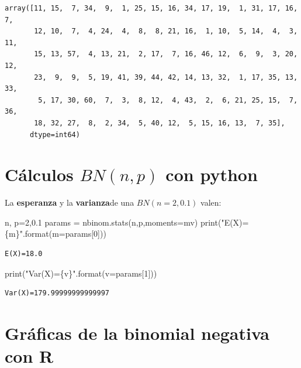 \documentclass[
  letterpaper,
  DIV=11,
  numbers=noendperiod]{scrreprt}
\newenvironment{Shaded}{\begin{snugshade}}{\end{snugshade}}
\newcommand{\BuiltInTok}[1]{\textcolor[rgb]{0.00,0.23,0.31}{#1}}
\newcommand{\DecValTok}[1]{\textcolor[rgb]{0.68,0.00,0.00}{#1}}
\newcommand{\FloatTok}[1]{\textcolor[rgb]{0.68,0.00,0.00}{#1}}
\newcommand{\NormalTok}[1]{\textcolor[rgb]{0.00,0.23,0.31}{#1}}
\newcommand{\OperatorTok}[1]{\textcolor[rgb]{0.37,0.37,0.37}{#1}}
\newcommand{\SpecialCharTok}[1]{\textcolor[rgb]{0.37,0.37,0.37}{#1}}
\newcommand{\StringTok}[1]{\textcolor[rgb]{0.13,0.47,0.30}{#1}}
\begin{document}
\begin{verbatim}
array([11, 15,  7, 34,  9,  1, 25, 15, 16, 34, 17, 19,  1, 31, 17, 16,  7,
       12, 10,  7,  4, 24,  4,  8,  8, 21, 16,  1, 10,  5, 14,  4,  3, 11,
       15, 13, 57,  4, 13, 21,  2, 17,  7, 16, 46, 12,  6,  9,  3, 20, 12,
       23,  9,  9,  5, 19, 41, 39, 44, 42, 14, 13, 32,  1, 17, 35, 13, 33,
        5, 17, 30, 60,  7,  3,  8, 12,  4, 43,  2,  6, 21, 25, 15,  7, 36,
       18, 32, 27,  8,  2, 34,  5, 40, 12,  5, 15, 16, 13,  7, 35],
      dtype=int64)
\end{verbatim}

\section{\texorpdfstring{Cálculos \(BN(n,p)\) con
python}{Cálculos BN(n,p) con python}}\label{cuxe1lculos-bnnp-con-python-2}

La \textbf{esperanza} y la \textbf{varianza}de una \(BN(n=2,0.1)\)
valen:

\begin{Shaded}
\begin{Highlighting}[]
\NormalTok{n, p}\OperatorTok{=}\DecValTok{2}\NormalTok{,}\FloatTok{0.1}
\NormalTok{params }\OperatorTok{=}\NormalTok{ nbinom.stats(n,p,moments}\OperatorTok{=}\StringTok{\textquotesingle{}mv\textquotesingle{}}\NormalTok{)}
\BuiltInTok{print}\NormalTok{(}\StringTok{"E(X)=}\SpecialCharTok{\{m\}}\StringTok{"}\NormalTok{.}\BuiltInTok{format}\NormalTok{(m}\OperatorTok{=}\NormalTok{params[}\DecValTok{0}\NormalTok{]))}
\end{Highlighting}
\end{Shaded}

\begin{verbatim}
E(X)=18.0
\end{verbatim}

\begin{Shaded}
\begin{Highlighting}[]
\BuiltInTok{print}\NormalTok{(}\StringTok{"Var(X)=}\SpecialCharTok{\{v\}}\StringTok{"}\NormalTok{.}\BuiltInTok{format}\NormalTok{(v}\OperatorTok{=}\NormalTok{params[}\DecValTok{1}\NormalTok{]))}
\end{Highlighting}
\end{Shaded}

\begin{verbatim}
Var(X)=179.99999999999997
\end{verbatim}

\section{Gráficas de la binomial negativa con
R}\label{gruxe1ficas-de-la-binomial-negativa-con-r}
\end{document}
